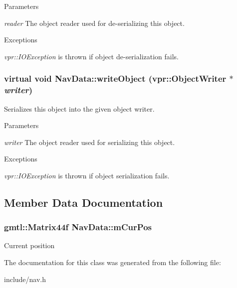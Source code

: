 \begin{DoxyParams}{Parameters}
\item[{\em reader}]The object reader used for de-\/serializing this object.\end{DoxyParams}

\begin{DoxyExceptions}{Exceptions}
\item[{\em vpr::IOException}]is thrown if object de-\/serialization fails. \end{DoxyExceptions}
\hypertarget{class_nav_data_a1b45f76f37dccac58ecbe51b601dbfc2}{
\subsubsection[{writeObject}]{\setlength{\rightskip}{0pt plus 5cm}virtual void NavData::writeObject (vpr::ObjectWriter $\ast$ {\em writer})}}
\label{class_nav_data_a1b45f76f37dccac58ecbe51b601dbfc2}
Serializes this object into the given object writer.


\begin{DoxyParams}{Parameters}
\item[{\em writer}]The object reader used for serializing this object.\end{DoxyParams}

\begin{DoxyExceptions}{Exceptions}
\item[{\em vpr::IOException}]is thrown if object serialization fails. \end{DoxyExceptions}


\subsection{Member Data Documentation}
\hypertarget{class_nav_data_a7ca13f1fcc20a97259c3e6f9a44e758f}{
\subsubsection[{mCurPos}]{\setlength{\rightskip}{0pt plus 5cm}gmtl::Matrix44f {\bf NavData::mCurPos}}}
\label{class_nav_data_a7ca13f1fcc20a97259c3e6f9a44e758f}
Current position 

The documentation for this class was generated from the following file:\begin{DoxyCompactItemize}
\item 
include/nav.h\end{DoxyCompactItemize}

